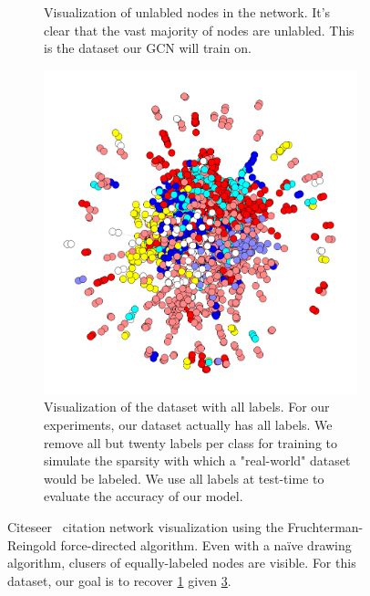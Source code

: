 \begin{figure}
\begin{subfigure}{0.32\textwidth}
		\caption{Visualization of unlabled nodes in the network. It's clear that the vast majority of nodes are unlabled. This is the dataset our GCN will train on.} %
        \label{fig:dataset_all}
	\end{subfigure}
	\vspace{1em} %
    \begin{subfigure}{0.32\textwidth} %
		\includegraphics[width=\textwidth]{media/labels_all.png}
        \caption{Visualization of the dataset with all labels. For our experiments, our dataset actually has all labels. We remove all but twenty labels per class for training to simulate the sparsity with which a "real-world" dataset would be labeled. We use all labels at test-time to evaluate the accuracy of our model.} %
        \label{fig:dataset_train}
	\end{subfigure}
	\caption{Citeseer~\cite{} citation network visualization using the Fruchterman-Reingold force-directed algorithm. Even with a na\"ive drawing algorithm, clusers of equally-labeled nodes are visible. For this dataset, our goal is to recover \ref{fig:dataset_all} given \ref{fig:dataset_train}.} %
\end{figure}



